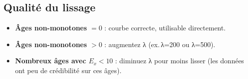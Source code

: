 \documentclass[11pt,a4paper]{article}
\begin{document}
\subsection{Qualité du lissage}

\begin{itemize}
  \item \textbf{Âges non-monotones $= 0$} : courbe correcte, utilisable directement.
  \item \textbf{Âges non-monotones $> 0$} : augmentez λ (ex.\,λ=200 ou λ=500).
  \item \textbf{Nombreux âges avec $E_x < 10$} : diminuez λ pour moins lisser
        (les données ont peu de crédibilité sur ces âges).
\end{itemize}
\end{document}
